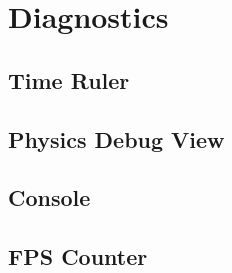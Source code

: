 \chapter{Diagnostics}
	\section{Time Ruler}
	\section{Physics Debug View}
	\section{Console}
	\section{FPS Counter}